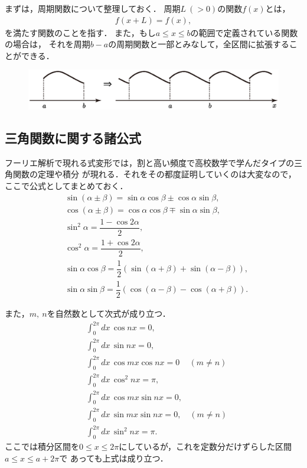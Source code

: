 まずは，周期関数について整理しておく．
周期$L~(>0)$の関数$f(x)$とは，
\begin{align}
  f\left(x + L\right) = f\left(x\right), 
\end{align}
を満たす関数のことを指す．
また，もし$a\leq x \leq b$の範囲で定義されている関数の場合は，
それを周期$b-a$の周期関数と一部とみなして，全区間に拡張することができる．
%
\begin{figure}[htbp]
  \includegraphics[width=1.0\linewidth]{figures/extend_function.eps} 
\end{figure}
%
\subsection{三角関数に関する諸公式}
%
フーリエ解析で現れる式変形では，割と高い頻度で高校数学で学んだタイプの三角関数の定理や積分
が現れる．それをその都度証明していくのは大変なので，ここで公式としてまとめておく．
\begin{align}
 &\sin\left(\alpha \pm \beta\right) = \sin\alpha \cos \beta \pm \cos\alpha \sin\beta, \\
 &\cos\left(\alpha \pm \beta\right) = \cos\alpha \cos \beta \mp \sin\alpha \sin\beta, \\
 &\sin^{2} \alpha = \dfrac{1-\cos 2\alpha}{2}, \\
 &\cos^{2} \alpha = \dfrac{1+\cos 2\alpha}{2}, \\
 &\sin \alpha \cos \beta = \dfrac{1}{2}\left(\sin(\alpha+\beta)+\sin\left(\alpha -\beta\right)\right), \label{tri_formula_01} \\
 &\sin \alpha \sin \beta = \dfrac{1}{2}\left(\cos(\alpha-\beta) - \cos(\alpha+\beta)\right). \label{tri_formula_02} 
\end{align}

また，$m,~n$を自然数として次式が成り立つ．
\begin{align}
 &\int_{0}^{2\pi}dx\,\cos nx = 0,  \label{tri_intformula_01} \\
 &\int_{0}^{2\pi}dx\,\sin nx = 0,  \label{tri_intformula_02} \\
 &\int_{0}^{2\pi}dx\,\cos mx \cos nx = 0\, \quad (m\neq n) \label{tri_intformula_03} \\
 &\int_{0}^{2\pi}dx\,\cos^{2} nx = \pi, \label{tri_intformula_04} \\
 &\int_{0}^{2\pi}dx\,\cos mx \sin nx = 0, \label{tri_intformula_05} \\
 &\int_{0}^{2\pi}dx\,\sin mx \sin nx = 0, \quad (m\neq n) \label{tri_intformula_06} \\
 &\int_{0}^{2\pi}dx\,\sin^{2} nx = \pi. \label{tri_intformula_07}
\end{align}
ここでは積分区間を$0\leq x \leq 2\pi$にしているが，これを定数分だけずらした区間$a\leq x \leq a + 2\pi$で
あっても上式は成り立つ．
%
